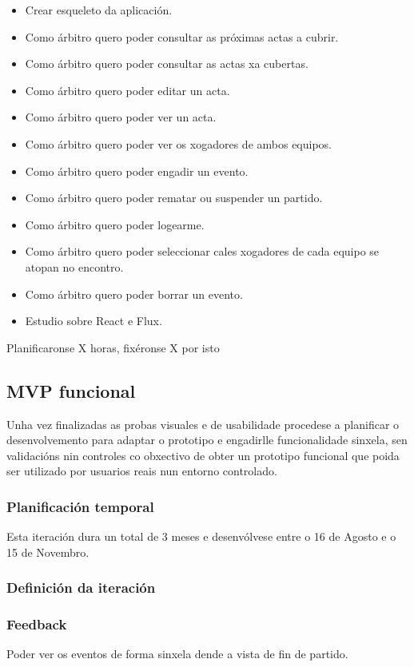       \begin{itemize}
        \item Crear esqueleto da aplicación.
        \item Como árbitro quero poder consultar as próximas actas a 
cubrir.
        \item Como árbitro quero poder consultar as actas xa cubertas.
        \item Como árbitro quero poder editar un acta.
        \item Como árbitro quero poder ver un acta.
        \item Como árbitro quero poder ver os xogadores de ambos equipos.
        \item Como árbitro quero poder engadir un evento.
        \item Como árbitro quero poder rematar ou suspender un partido.
        \item Como árbitro quero poder logearme.
        \item Como árbitro quero poder seleccionar cales xogadores de cada 
equipo se atopan no encontro.
        \item Como árbitro quero poder borrar un evento.
        \item Estudio sobre React e Flux.
       \end{itemize}

      Planificaronse X horas, fixéronse X por isto

    \subsection{MVP funcional}
    Unha vez finalizadas as probas visuales e de usabilidade procedese 
a planificar o desenvolvemento para adaptar o prototipo e engadirlle 
funcionalidade sinxela, sen validacións nin controles co obxectivo de obter un 
prototipo funcional que poida ser utilizado por usuarios reais nun entorno 
controlado.

      \subsubsection{Planificación temporal}
      Esta iteración dura un total de 3 meses e desenvólvese entre o 16 de 
Agosto e o 15 de Novembro.

      \subsubsection{Definición da iteración}
      \subsubsection{Feedback}
        \item Poder ver os eventos de forma sinxela dende a vista de fin de 
partido.
